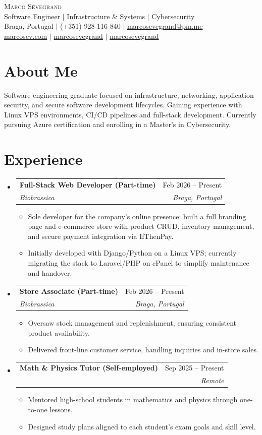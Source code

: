 \documentclass[11pt,a4paper]{article}
\makeatletter
\newcommand{\resumeItem}[1]{
	\item\small{#1}
}
\newcommand{\resumeSubheading}[4]{
	\item
		\begin{tabular*}{\textwidth}[t]{l@{\extracolsep{\fill}}r}
			\textbf{#1} & {\small #2} \\
			\textit{\small #3} & \textit{\small #4} \\
		\end{tabular*}\vspace{-0.45em}
}
\newcommand{\resumeSubHeadingListStart}{\begin{itemize}[leftmargin=0pt, label={}, itemsep=0.55em, topsep=0.25em, parsep=0pt, partopsep=0pt]}
\newcommand{\resumeSubHeadingListEnd}{\end{itemize}}
\newcommand{\resumeItemListStart}{\begin{itemize}[leftmargin=1.15em, itemsep=0.16em, topsep=0.28em, parsep=0pt, partopsep=0pt]}
\newcommand{\resumeItemListEnd}{\end{itemize}\vspace{-0.2em}}
\newcommand{\iconlink}[3]{\href{#1}{#2\hspace{0.35em}#3}}
\makeatother
\begin{document}
\begin{center}
	{\Huge \scshape Marco S\`evegrand} \\
	\vspace{3pt}
	{\small\color{muted} Software Engineer $|$ Infrastructure \& Systems $|$ Cybersecurity} \\
	\vspace{5pt}
	\small Braga, Portugal $|$ (+351) 928 116 840 $|$ \href{mailto:marcosevegrand@pm.me}{marcosevegrand@pm.me} \\
	\vspace{1pt}
	\small \iconlink{https://marcosev.com}{\faGlobe}{marcosev.com} $|$ \iconlink{https://linkedin.com/in/marcosevegrand}{\faLinkedin}{marcosevegrand} $|$ \iconlink{https://github.com/marcosevegrand}{\faGithub}{marcosevegrand}
\end{center}

\section{About Me}
\small Software engineering graduate focused on infrastructure, networking, application security, and secure software development lifecycles. Gaining experience with Linux VPS environments, CI/CD pipelines and full-stack development. Currently pursuing Azure certification and enrolling in a Master's in Cybersecurity.

\section{Experience}
\resumeSubHeadingListStart
	\resumeSubheading
		{Full-Stack Web Developer (Part-time)}{Feb 2026 -- Present}
		{Biobrassica}{Braga, Portugal}
		\resumeItemListStart
			\resumeItem{Sole developer for the company's online presence: built a full branding page and e-commerce store with product CRUD, inventory management, and secure payment integration via IfThenPay.}
			\resumeItem{Initially developed with Django/Python on a Linux VPS; currently migrating the stack to Laravel/PHP on cPanel to simplify maintenance and handover.}
		\resumeItemListEnd

	\resumeSubheading
		{Store Associate (Part-time)}{Feb 2026 -- Present}
		{Biobrassica}{Braga, Portugal}
		\resumeItemListStart
			\resumeItem{Oversaw stock management and replenishment, ensuring consistent product availability.}
			\resumeItem{Delivered front-line customer service, handling inquiries and in-store sales.}
		\resumeItemListEnd

	\resumeSubheading
		{Math \& Physics Tutor (Self-employed)}{Sep 2025 -- Present}
		{}{Remote}
		\resumeItemListStart
			\resumeItem{Mentored high-school students in mathematics and physics through one-to-one lessons.}
			\resumeItem{Designed study plans aligned to each student's exam goals and skill level.}
		\resumeItemListEnd
\resumeSubHeadingListEnd
\end{document}

